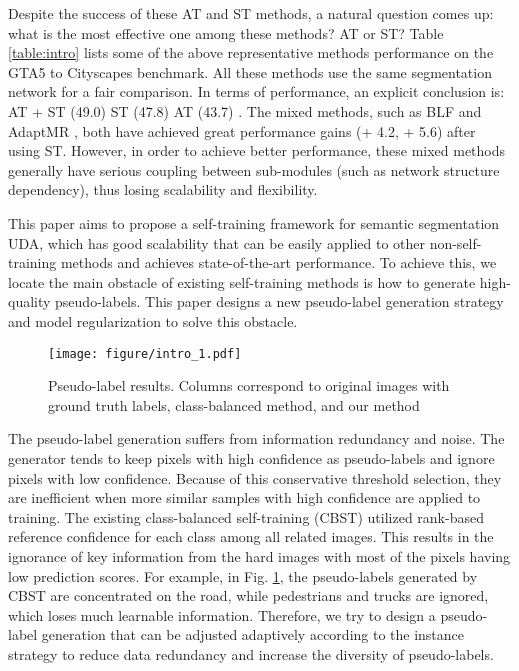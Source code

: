 \documentclass[runningheads]{llncs}
\begin{document}
Despite the success of these AT and ST methods, a natural question comes up: what is the most effective one among these methods? AT or ST? Table \ref{table:intro} lists some of the above representative methods performance on the GTA5 to Cityscapes benchmark. All these methods use the same segmentation network for a fair comparison. In terms of performance, an explicit conclusion is: AT + ST (49.0) \cite{li2019bidirectional,zheng2019unsupervised}  ST (47.8) \cite{lian2019constructing,zou2019confidence}  AT (43.7) \cite{tsai2018learning,vu2019advent}. The mixed methods, such as BLF \cite{li2019bidirectional} and AdaptMR \cite{zheng2019unsupervised}, both have achieved great performance gains (+ 4.2, + 5.6) after using ST. However, in order to achieve better performance, these mixed methods generally have serious coupling between sub-modules (such as network structure dependency), thus losing scalability and flexibility.

This paper aims to propose a self-training framework for semantic segmentation UDA, which has good scalability that can be easily applied to other non-self-training methods and achieves state-of-the-art performance. To achieve this, we locate the main obstacle of existing self-training methods is how to generate high-quality pseudo-labels. This paper designs a new pseudo-label generation strategy and model regularization to solve this obstacle.

\begin{figure}[ht] 
    \centering 
    \texttt{[image: figure/intro\_1.pdf]} 
    \caption{Pseudo-label results. Columns correspond to original images with ground truth labels, class-balanced method, and our method}
    \label{fig:itro} 
\end{figure}

The pseudo-label generation suffers from information redundancy and noise. The generator tends to keep pixels with high confidence as pseudo-labels and ignore pixels with low confidence. Because of this conservative threshold selection, they are inefficient when more similar samples with high confidence are applied to training. The existing class-balanced self-training (CBST) \cite{zou2018unsupervised} utilized rank-based reference confidence for each class among all related images. This results in the ignorance of key information from the hard images with most of the pixels having low prediction scores. For example, in Fig. \ref{fig:itro}, the pseudo-labels generated by CBST are concentrated on the road, while pedestrians and trucks are ignored, which loses much learnable information. Therefore, we try to design a pseudo-label generation that can be adjusted adaptively according to the instance strategy to reduce data redundancy and increase the diversity of pseudo-labels.
\end{document}
